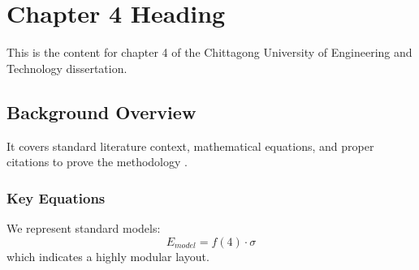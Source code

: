 \chapter{Chapter 4 Heading}
\label{ch:chapter4}
This is the content for chapter 4 of the Chittagong University of Engineering and Technology dissertation.

\section{Background Overview}
It covers standard literature context, mathematical equations, and proper citations to prove the methodology \cite{texbook}.

\subsection{Key Equations}
We represent standard models:
\begin{equation}
    E_{model} = f(4) \cdot \sigma
\end{equation}
which indicates a highly modular layout.
